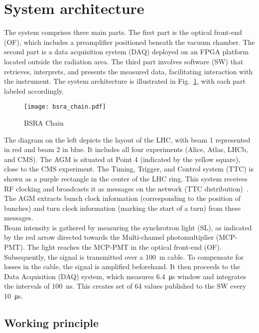 \section{System architecture}
The system comprises three main parts. The first part is the optical front-end
(OF), which includes a preamplifier positioned beneath the vacuum chamber. The
second part is a data acquisition system (DAQ) deployed on an FPGA platform
located outside the radiation area. The third part involves software (SW) that
retrieves, interprets, and presents the measured data, facilitating interaction
with the instrument. The system architecture is illustrated in
Fig.~\ref{fig:bsra_chain}, with each part labeled accordingly.
\begin{figure}[!tbh]
    \centering
    \texttt{[image: bsra\_chain.pdf]}
    \caption{BSRA Chain}
    \label{fig:bsra_chain}
\end{figure} 
The diagram on the left depicts the layout of the LHC, with beam 1 represented
in red and beam 2 in blue. It includes all four experiments (Alice, Atlas,
LHCb, and CMS). The AGM is situated at Point 4 (indicated by the yellow
square), close to the CMS experiment. The Timing, Trigger, and Control system
(TTC) is shown as a purple rectangle in the center of the LHC ring. This system
receives RF clocking and broadcasts it as messages on the network (TTC
distribution)~\cite{ttc_distribution}. The AGM extracts bunch clock information
(corresponding to the position of bunches) and turn clock information (marking
the start of a turn) from these messages.\\
Beam intensity is gathered by measuring the synchrotron light (SL), as
indicated by the red arrow directed towards the Multi-channel photomultiplier
(MCP-PMT). The light reaches the MCP-PMT in the optical front-end (OF).
Subsequently, the signal is transmitted over a \SI{100}{m} cable. To compensate
for losses in the cable, the signal is amplified beforehand. It then proceeds
to the Data Acquisition (DAQ) system, which measures \SI{6.4}{\micro\second}
window and integrates the intervals of \SI{100}{\nano\second}. This creates set
of 64 values published to the SW every \SI{10}{\micro\second}.

\subsection{Working principle}

